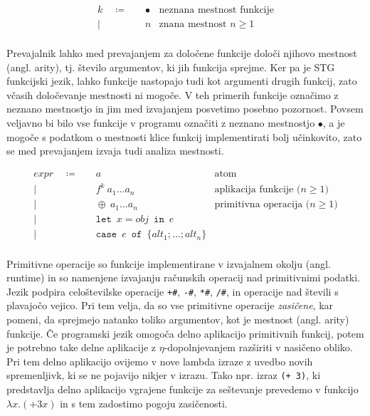 \begin{align*}
	k \quad \coloneq& \quad \bullet & \text{neznana mestnost funkcije}\\
	\vert& \quad n & \text{znana mestnost $n \geq 1$}\\
\end{align*}

Prevajalnik lahko med prevajanjem za določene funkcije določi njihovo mestnost (angl. arity), tj. število argumentov, ki jih funkcija sprejme. Ker pa je STG funkcijski jezik, lahko funkcije nastopajo tudi kot argumenti drugih funkcij, zato včasih določevanje mestnosti ni mogoče. V teh primerih funkcije označimo z neznano mestnostjo in jim med izvajanjem posvetimo posebno pozornost. Povsem veljavno bi bilo vse funkcije v programu označiti z neznano mestnostjo $\bullet$, a je mogoče s podatkom o mestnosti klice funkcij implementirati bolj učinkovito, zato se med prevajanjem izvaja tudi analiza mestnosti. 

\begin{align*}
	expr \quad \coloneq& \quad a & \text{atom}\\
	\vert& \quad f^k \: a_1 \dots a_n & \text{aplikacija funkcije ($n \geq 1$)}\\
	\vert& \quad \oplus \: a_1 \dots a_n & \text{primitivna operacija ($n \geq 1$)}\\
	\vert& \quad \texttt{let} \enspace x = obj \enspace \texttt{in} \enspace e & \text{} \\
	\vert& \quad \texttt{case} \enspace e \enspace \texttt{of} \enspace \{ alt_1; \dots; alt_n \}& \text{} \\
\end{align*}

Primitivne operacije so funkcije implementirane v izvajalnem okolju (angl. runtime) in so namenjene izvajanju računskih operacij nad  primitivnimi podatki. Jezik podpira celoštevilske operacije \texttt{+\#}, \texttt{-\#}, \texttt{*\#}, \texttt{/\#}, in operacije nad števili s plavajočo vejico. Pri tem velja, da so vse primitivne operacije \textit{zasičene}, kar pomeni, da sprejmejo natanko toliko argumentov, kot je mestnost (angl. arity) funkcije. Če programski jezik omogoča delno aplikacijo primitivnih funkcij, potem je potrebno take delne aplikacije z $\eta$-dopolnjevanjem razširiti v nasičeno obliko. Pri tem delno aplikacijo ovijemo v nove lambda izraze z uvedbo novih spremenljivk, ki se ne pojavijo nikjer v izrazu. Tako npr. izraz \texttt{(+ 3)}, ki predstavlja delno aplikacijo vgrajene funkcije za seštevanje prevedemo v funkcijo $\lambda x . (+ 3 x)$ in s tem zadostimo pogoju zasičenosti.

